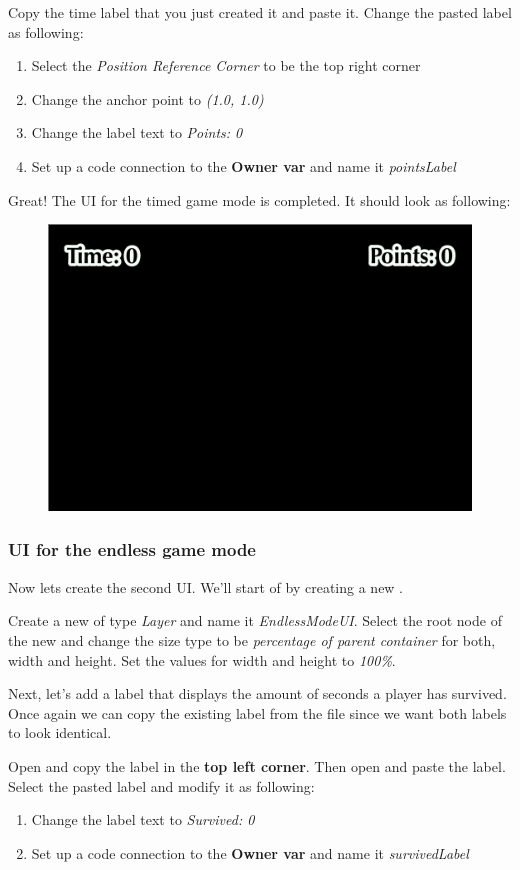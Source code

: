 \begin{leftbar}
Copy the time label that you just created it and paste it. Change the pasted
label as following:
\begin{enumerate}
  \item Select the \textit{Position Reference Corner} to be the top right corner
  \item Change the anchor point to \textit{(1.0, 1.0)}
  \item Change the label text to \textit{Points: 0}
  \item Set up a code connection to the \textbf{Owner var} and name it \textit{pointsLabel}
\end{enumerate}
\end{leftbar}

Great! The UI for the timed game mode is completed. It should look as following:

\begin{figure}[H]
    \centering
    \includegraphics[width=0.5\linewidth]{images/Chapter7/timed_mode_ui.png}
\end{figure}

\subsubsection{UI for the endless game mode}
Now lets create the second UI. We'll start of by creating a new \ccbfile{}.
\begin{leftbar}
Create a new \ccbfile{} of type \textit{Layer} and name it
\textit{EndlessModeUI}. Select the root node of the new \ccbfile{} and change
the size type to be \textit{percentage of parent container} for both, width and height. Set the
values for width and height to \textit{100\%}.
\end{leftbar}
Next, let's add a label that displays the amount of seconds a player has
survived. Once again we can copy the existing label from the
 file since we want both labels to look identical.
\begin{leftbar}
Open  and copy the label in the \textbf{top left
corner}. Then open  and paste the label. Select
the pasted label and modify it as following:
\begin{enumerate}
  \item Change the label text to \textit{Survived: 0}
  \item Set up a code connection to the \textbf{Owner var} and name it \textit{survivedLabel}
\end{enumerate}
\end{leftbar}

